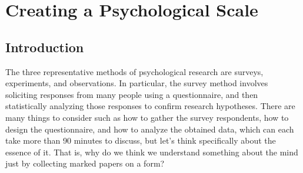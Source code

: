 \documentclass{ltjsbook}
\begin{document}
\chapter{Creating a Psychological Scale}
\label{x02_testTheory}
\section{Introduction}
The three representative methods of psychological research are surveys, experiments, and observations. In particular, the survey method involves soliciting responses from many people using a questionnaire, and then statistically analyzing those responses to confirm research hypotheses. There are many things to consider such as how to gather the survey respondents, how to design the questionnaire, and how to analyze the obtained data, which can each take more than 90 minutes to discuss, but let's think specifically about the essence of it. That is, why do we think we understand something about the mind just by collecting marked papers on a form?
\end{document}
